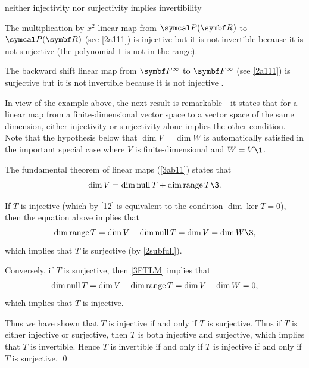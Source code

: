 \begin{example}[ninsii]{neither injectivity nor surjectivity implies invertibility}
\begin{Itemize}
\item
The multiplication by $x^2$ linear map from $\P(\R{})$ to $\P(\R{})$ (see \ref{2a111}) is injective but it is not invertible because it is not surjective (the polynomial $1$ is not in the range).
\item
The backward shift linear map from $\F{\infty}$ to $\F{\infty}$ (see \ref{2a111}) is surjective but it is not invertible because it is not injective .
\end{Itemize}
\exampleitemend
\end{example}

In view of the example above, the next result is remarkable---it states that for a linear map from a finite-dimensional vector space to a vector space of the same dimension, either injectivity or surjectivity alone implies the other condition. Note that the hypothesis below that $\dim V = \dim W$ is automatically satisfied in the important special case where $V$ is finite-dimensional and $W = V\1$.


\proof
The fundamental theorem of linear maps (\ref{3ab11}) states that
\begin{equation} \label{3FTLM}
\dim V = \dim \ker T + \dim \ran T\3.
\end{equation}%

If $T$ is injective (which by \ref{12} is equivalent to the condition $\dim \ker T = 0$), then the equation above implies that
\[
\dim \ran T = \dim V - \dim \ker T = \dim V = \dim W\3,
\]
which implies that $T$ is surjective (by \ref{2subfull}).

Conversely, if $T$ is surjective, then \ref{3FTLM} implies that
\[
\dim \operatorname{null} T = \dim V - \dim \operatorname{range} T = \dim V - \dim W = 0,
\]
which implies that $T$ is injective.

Thus we have shown that $T$ is injective if and only if $T$ is surjective. Thus if $T$ is either injective or surjective, then $T$ is both injective and surjective, which implies that $T$ is invertible. Hence $T$ is invertible if and only if $T$ is injective if and only if $T$ is surjective.
\qed

